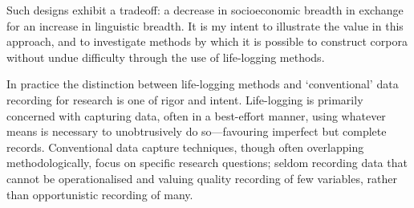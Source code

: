 Such designs exhibit a tradeoff: a decrease in socioeconomic breadth in exchange for an increase in linguistic breadth.  It is my intent to illustrate the value in this approach, and to investigate methods by which it is possible to construct corpora without undue difficulty through the use of life-logging methods.






In practice the distinction between life-logging methods and `conventional' data recording for research is one of rigor and intent.  Life-logging is primarily concerned with capturing data, often in a best-effort manner, using whatever means is necessary to unobtrusively do so---favouring imperfect but complete records.  Conventional data capture techniques, though often overlapping methodologically, focus on specific research questions; seldom recording data that cannot be operationalised and valuing quality recording of few variables, rather than opportunistic recording of many.



